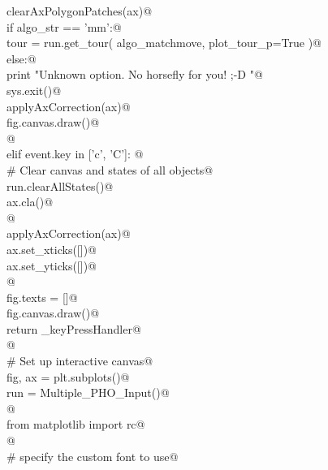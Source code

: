 \documentclass[10pt, english, oneside]{report}
\begin{document}
\begin{appendices}
\begin{flushleft}
\begin{list}{}{}
\mbox{}\verb@                    clearAxPolygonPatches(ax)@\\
\mbox{}\verb@                    if   algo_str == 'mm':@\\
\mbox{}\verb@                          tour = run.get_tour( algo_matchmove, plot_tour_p=True )@\\
\mbox{}\verb@                    else:@\\
\mbox{}\verb@                          print "Unknown option. No horsefly for you! ;-D "@\\
\mbox{}\verb@                          sys.exit()@\\
\mbox{}\verb@                    applyAxCorrection(ax)@\\
\mbox{}\verb@                    fig.canvas.draw()@\\
\mbox{}\verb@                    @\\
\mbox{}\verb@               elif event.key in ['c', 'C']: @\\
\mbox{}\verb@                    # Clear canvas and states of all objects@\\
\mbox{}\verb@                    run.clearAllStates()@\\
\mbox{}\verb@                    ax.cla()@\\
\mbox{}\verb@                                  @\\
\mbox{}\verb@                    applyAxCorrection(ax)@\\
\mbox{}\verb@                    ax.set_xticks([])@\\
\mbox{}\verb@                    ax.set_yticks([])@\\
\mbox{}\verb@                                     @\\
\mbox{}\verb@                    fig.texts = []@\\
\mbox{}\verb@                    fig.canvas.draw()@\\
\mbox{}\verb@           return _keyPressHandler@\\
\mbox{}\verb@    @\\
\mbox{}\verb@    # Set up interactive canvas@\\
\mbox{}\verb@    fig, ax =  plt.subplots()@\\
\mbox{}\verb@    run = Multiple_PHO_Input()@\\
\mbox{}\verb@        @\\
\mbox{}\verb@    from matplotlib import rc@\\
\mbox{}\verb@    @\\
\mbox{}\verb@    # specify the custom font to use@\\

\end{list}
\end{flushleft}
\end{appendices}
\end{document}
